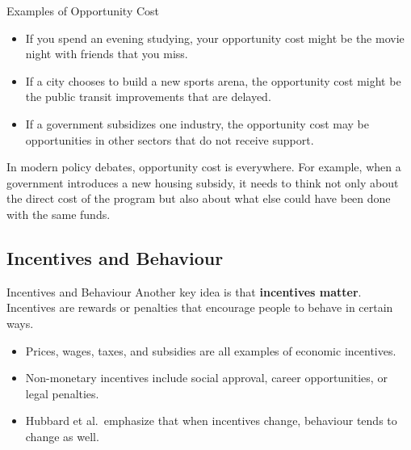 \documentclass[aspectratio=169]{beamer}
\begin{document}
\begin{frame}{Examples of Opportunity Cost}
  \transfade
  \begin{itemize}[<+->]
    \item If you spend an evening studying, your opportunity cost might be the movie night with
    friends that you miss.
    \item If a city chooses to build a new sports arena, the opportunity cost might be the public
    transit improvements that are delayed.
    \item If a government subsidizes one industry, the opportunity cost may be opportunities in
    other sectors that do not receive support.
  \end{itemize}

  \vspace{0.3cm}
  In modern policy debates, opportunity cost is everywhere. For example, when a government
  introduces a new housing subsidy, it needs to think not only about the direct cost of the
  program but also about what else could have been done with the same funds.
\end{frame}

\subsection{Incentives and Behaviour}

\begin{frame}{Incentives and Behaviour}
  \transfade
  Another key idea is that \textbf{incentives matter}. Incentives are rewards or penalties that
  encourage people to behave in certain ways.

  \begin{itemize}[<+->]
    \item Prices, wages, taxes, and subsidies are all examples of economic incentives.
    \item Non-monetary incentives include social approval, career opportunities, or legal penalties.
    \item Hubbard et al.\ emphasize that when incentives change, behaviour tends to change as well.
  \end{itemize}
\end{frame}
\end{document}
